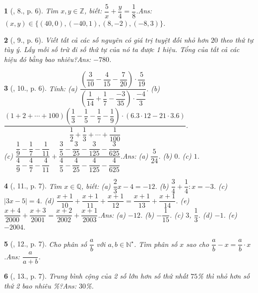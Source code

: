 \documentclass{article}
\newtheorem{baitoan}{}
\begin{document}
\begin{baitoan}[\cite{Binh_Toan_7_tap_1}, 8., p. 6]
	Tìm $x,y\in\mathbb{Z}$, biết: $\dfrac{5}{x} + \dfrac{y}{4} = \dfrac{1}{8}$.\hfill{\sf Ans: $(x,y)\in\{(40,0),(-40,1),(8,-2),(-8,3)\}$.}
\end{baitoan}

\begin{baitoan}[\cite{Binh_Toan_7_tap_1}, 9., p. 6]
	Viết tất cả các số nguyên có giá trị tuyệt đối nhỏ hơn $20$ theo thứ tự tùy ý. Lấy mỗi số trừ đi số thứ tự của nó ta được 1 hiệu. Tổng của tất cả các hiệu đó bằng bao nhiêu?\hfill{\sf Ans: $-780$.}
\end{baitoan}

\begin{baitoan}[\cite{Binh_Toan_7_tap_1}, 10., p. 6]
	Tính: (a) $\dfrac{\left(\dfrac{3}{10} - \dfrac{4}{15} - \dfrac{7}{20}\right)\cdot\dfrac{5}{19}}{\left(\dfrac{1}{14} + \dfrac{1}{7} - \dfrac{-3}{35}\right)\cdot\dfrac{-4}{3}}$. (b) $\dfrac{(1 + 2 + \cdots + 100)\left(\dfrac{1}{3} - \dfrac{1}{5} - \dfrac{1}{7} - \dfrac{1}{9}\right)\cdot(6.3\cdot 12 - 21\cdot 3.6)}{\dfrac{1}{2} + \dfrac{1}{3} + \cdots + \dfrac{1}{100}}$.\\(c) $\dfrac{\dfrac{1}{9} - \dfrac{1}{7} - \dfrac{1}{11}}{\dfrac{4}{9} - \dfrac{4}{7} - \dfrac{4}{11}} + \dfrac{\dfrac{3}{5} - \dfrac{3}{25} - \dfrac{3}{125} - \dfrac{3}{625}}{\dfrac{4}{5} - \dfrac{4}{25} - \dfrac{4}{125} - \dfrac{4}{625}}$.\hfill{\sf Ans: (a) $\dfrac{5}{24}$. (b) $0$. (c) $1$.}
\end{baitoan}

\begin{baitoan}[\cite{Binh_Toan_7_tap_1}, 11., p. 7]
	Tìm $x\in\mathbb{Q}$, biết: (a) $\dfrac{2}{3}x - 4 = -12$. (b) $\dfrac{3}{4} + \dfrac{1}{4}:x = -3$. (c) $|3x - 5| = 4$. (d) $\dfrac{x + 1}{10} + \dfrac{x + 1}{11} + \dfrac{x + 1}{12} = \dfrac{x + 1}{13} + \dfrac{x + 1}{14}$. (e) $\dfrac{x + 4}{2000} + \dfrac{x + 3}{2001} = \dfrac{x + 2}{2002} + \dfrac{x + 1}{2003}$.\hfill{\sf Ans: (a) $-12$. (b) $-\dfrac{1}{15}$. (c) $3$, $\dfrac{1}{3}$. (d) $-1$. (e) $-2004$.}
\end{baitoan}

\begin{baitoan}[\cite{Binh_Toan_7_tap_1}, 12., p. 7]
	Cho phân số $\dfrac{a}{b}$ với $a,b\in\mathbb{N}^\star$. Tìm phân số $x$ sao cho $\dfrac{a}{b} - x = \dfrac{a}{b}\cdot x$.\hfill{\sf Ans: $\dfrac{a}{a + b}$.}
\end{baitoan}

\begin{baitoan}[\cite{Binh_Toan_7_tap_1}, 13., p. 7]
	Trung bình cộng của 2 số lớn hơn số thứ nhất $75$\% thì nhỏ hơn số thứ 2 bao nhiêu \%?\hfill{\sf Ans: $30$\%.}
\end{baitoan}
\end{document}
